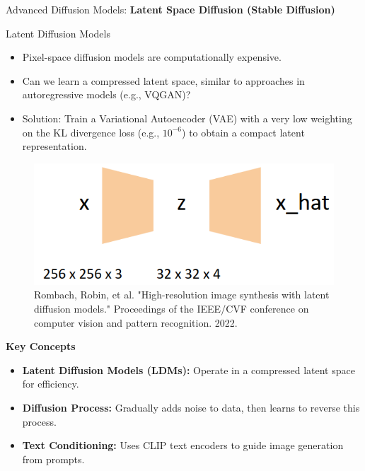 \begin{frame}{}
    \LARGE Advanced Diffusion Models: \textbf{Latent Space Diffusion (Stable Diffusion)}
\end{frame}

\begin{frame}[allowframebreaks]{Latent Diffusion Models}

    \begin{itemize}
        \item Pixel-space diffusion models are computationally expensive.
        \item Can we learn a compressed latent space, similar to approaches in autoregressive models (e.g., VQGAN)?
        \item Solution: Train a Variational Autoencoder (VAE) with a very low weighting on the KL divergence loss (e.g., $10^{-6}$) to obtain a compact latent representation.
    \end{itemize}

    \begin{figure}
        \centering
        \includegraphics[width=0.5\linewidth,height=0.4\textheight,keepaspectratio]{images/adv-img-gen/slide_96_1_img.png}
        \caption*{Rombach, Robin, et al. "High-resolution image synthesis with latent diffusion models." Proceedings of the IEEE/CVF conference on computer vision and pattern recognition. 2022.}
    \end{figure}

    \framebreak

    \textbf{Key Concepts}
    \begin{itemize}
        \item \textbf{Latent Diffusion Models (LDMs):} Operate in a compressed latent space for efficiency.
        \item \textbf{Diffusion Process:} Gradually adds noise to data, then learns to reverse this process.
        \item \textbf{Text Conditioning:} Uses CLIP text encoders to guide image generation from prompts.
    \end{itemize}

    \framebreak


\end{frame}
